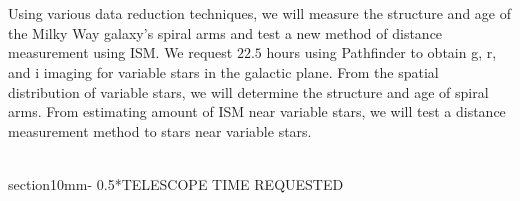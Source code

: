 \documentclass[letterpaper,11pt]{article}
\makeatletter
\renewcommand{\section}{\@startsection%
{section}{1}{0mm}{-\baselineskip}%
{0.5\baselineskip}{\normalfont\Large\bfseries}}%
\newenvironment{Frame}{%
  \noindent\setbox\FrameBox\hbox\bgroup\minipage{1.01\textwidth}\parskip\baselineskip\ignorespaces
}{%
  \endminipage\egroup\fbox{\box\FrameBox}\par
}
\makeatother
\begin{document}
~\\~\\ %

\begin{Frame}
\noindent {\bf \\Abstract:}
Using various data reduction techniques, we will measure the structure and age of the Milky Way galaxy's spiral arms and test a new method of distance measurement using ISM. We request $22.5$ hours using Pathfinder to obtain g, r, and i imaging for variable stars in the galactic plane. From the spatial distribution of variable stars, we will determine the structure and age of spiral arms. From estimating amount of ISM near variable stars, we will test a distance measurement method to stars near variable stars.

\end{Frame}
~\\


\section*{TELESCOPE TIME REQUESTED}

\begin{table}[H]\label{tab:request-telescope-time}
	\begin{center}
	\end{center}
\end{table}
\end{document}
